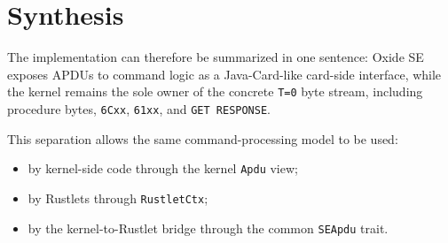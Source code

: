 \section{Synthesis}

The implementation can therefore be summarized in one sentence:
Oxide SE exposes APDUs to command logic as a Java-Card-like card-side
interface, while the kernel remains the sole owner of the concrete
\texttt{T=0} byte stream, including procedure bytes, \texttt{6Cxx},
\texttt{61xx}, and \texttt{GET RESPONSE}.

This separation allows the same command-processing model to be used:
\begin{itemize}
\item by kernel-side code through the kernel \texttt{Apdu} view;
\item by Rustlets through \texttt{RustletCtx};
\item by the kernel-to-Rustlet bridge through the common
  \texttt{SEApdu} trait.
\end{itemize}
